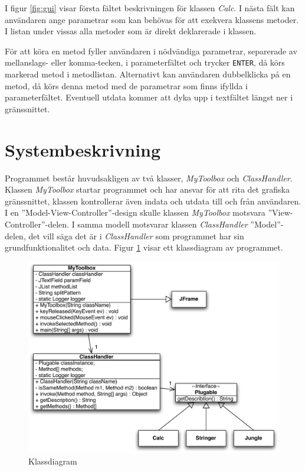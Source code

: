 \documentclass[a4paper, 12pt]{article}
\begin{document}
I figur \ref{fig:gui} visar första fältet beskrivningen för klassen
\textit{Calc}. I nästa fält kan användaren ange parametrar som kan
behövas för att exekvera klassens metoder. I listan under vissas alla
metoder som är direkt deklarerade i klassen.

För att köra en metod fyller användaren i nödvändiga parametrar,
separerade av mellanslags- eller komma-tecken, i parameterfältet och
trycker \verb!ENTER!, då körs markerad metod i
metodlistan. Alternativt kan användaren dubbelklicka på en metod, då
körs denna metod med de parametrar som finns ifyllda i
parameterfältet. Eventuell utdata kommer att dyka upp i textfältet
längst ner i gränssnittet.

\section{Systembeskrivning}
Programmet består huvudsakligen av två klasser, \textit{MyToolbox} och
\textit{ClassHandler}. Klassen \textit{MyToolbox} startar programmet
och har ansvar för att rita det grafiska gräns\-snittet, klassen
kontrollerar även indata och utdata till och från använd\-aren. I en
''Model-View-Controller''-design skulle klassen \textit{MyToolbox}
motsvara ''View-Controller''-delen. I samma modell motsvarar klassen
\textit{ClassHandler} ''Model''-delen, det vill säga det är i
\textit{ClassHandler} som programmet har sin grundfunktionalitet och
data. Figur \ref{fig:class} visar ett klassdiagram av programmet.

\begin{figure}[H]
  \begin{center}
    \includegraphics[width=130mm]{images/class.pdf}
    \caption{Klassdiagram}
    \label{fig:class}
  \end{center}
\end{figure}
\end{document}
